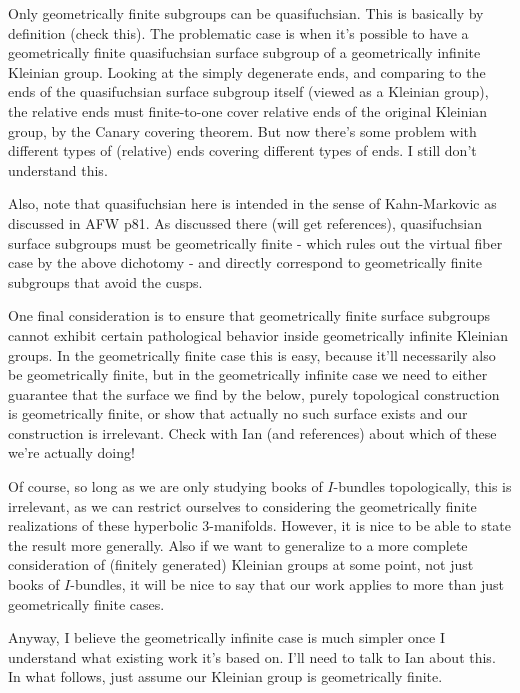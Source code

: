 \documentclass[12pt]{amsart}
\theoremstyle{definition}
\theoremstyle{remark}
\begin{document}

Only geometrically finite subgroups can be quasifuchsian. This is basically by
definition (check this). The problematic case is when it's possible to have
a geometrically finite quasifuchsian surface subgroup of a geometrically
infinite Kleinian group. Looking at the simply degenerate ends, and comparing
to the ends of the quasifuchsian surface subgroup itself (viewed as a Kleinian
group), the relative ends must finite-to-one cover relative ends of the
original Kleinian group, by the Canary covering theorem. But now there's some
problem with different types of (relative) ends covering different types of
ends. I still don't understand this.

Also, note that quasifuchsian here is intended in the sense of Kahn-Markovic as
discussed in AFW p81. As discussed there (will get references), quasifuchsian
surface subgroups must be geometrically finite - which rules out the virtual
fiber case by the above dichotomy - and directly correspond to geometrically
finite subgroups that avoid the cusps.

One final consideration is to ensure that geometrically finite surface
subgroups cannot exhibit certain pathological behavior inside geometrically
infinite Kleinian groups. In the geometrically finite case this is easy,
because it'll necessarily also be geometrically finite, but in the
geometrically infinite case we need to either guarantee that the surface we
find by the below, purely topological construction is geometrically finite, or
show that actually no such surface exists and our construction is irrelevant.
Check with Ian (and references) about which of these we're actually doing!

Of course, so long as we are only studying books of $I$-bundles topologically,
this is irrelevant, as we can restrict ourselves to considering the
geometrically finite realizations of these hyperbolic 3-manifolds. However, it
is nice to be able to state the result more generally. Also if we want to
generalize to a more complete consideration of (finitely generated) Kleinian
groups at some point, not just books of $I$-bundles, it will be nice to say that
our work applies to more than just geometrically finite cases.

Anyway, I believe the geometrically infinite case is much simpler once
I understand what existing work it's based on. I'll need to talk to Ian about
this. In what follows, just assume our Kleinian group is geometrically finite.
\end{document}
